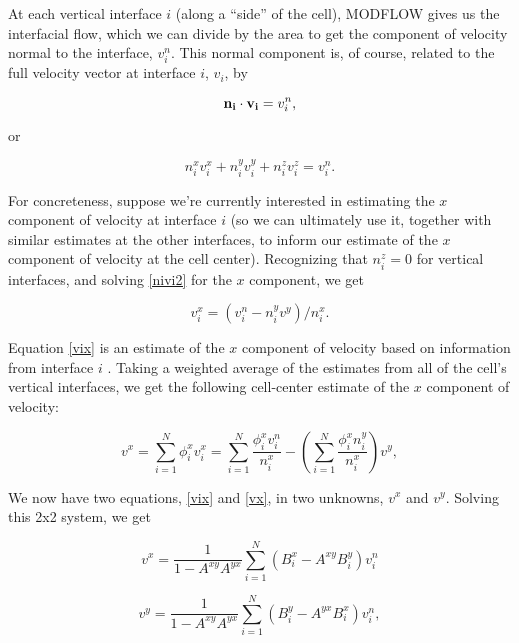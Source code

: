 At each vertical interface $i$ (along a ``side'' of the cell), MODFLOW gives us the interfacial flow, which we can divide by the area to get the component of velocity normal to the interface, $v_i^n$. This normal component is, of course, related to the full velocity vector at interface $i$, $v_i$, by

\begin{equation}
\label{nivi}
\mathbf{n_i} \cdot \mathbf{v_i} = v_i^n,
\end{equation}

\noindent or

\begin{equation}
\label{nivi2}
n_i^x v_i^x + n_i^y v_i^y + n_i^z v_i^z = v_i^n.
\end{equation}

For concreteness, suppose we're currently interested in estimating the $x$ component of velocity at interface $i$ (so we can ultimately use it, together with similar estimates at the other interfaces, to inform our estimate of the $x$ component of velocity at the cell center).  Recognizing that $n_i^z = 0$  for vertical interfaces, and solving \ref{nivi2} for the $x$ component, we get

\begin{equation}
\label{vix}
v_i^x = \left ( v_i^n - n_i^y v^y \right ) / n_i^x.
\end{equation}

Equation \ref{vix} is an estimate of the $x$ component of velocity based on information from interface $i$ . Taking a weighted average of the estimates from all of the cell's vertical interfaces, we get the following cell-center estimate of the $x$ component of velocity:

\begin{equation}
\label{vx}
v^x = \sum_{i=1}^N \phi_i^x v_i^x = \sum_{i=1}^N \frac{\phi_i^x v_i^n}{n_i^x} - \left( \sum_{i=1}^N \frac{\phi_i^x n_i^y}{n_i^x}  \right ) v^y,
\end{equation}

We now have two equations, \ref{vix} and \ref{vx}, in two unknowns, $v^x$ and $v^y$. Solving this 2x2 system, we get

\begin{equation}
\label{vxAB}
v^x = \frac{1}{1 - A^{xy} A^{yx}} \sum_{i=1}^N  \left( B_i^x - A^{xy} B_i^y \right ) v_i^n
\end{equation}

\begin{equation}
\label{vxAB}
v^y = \frac{1}{1 - A^{xy} A^{yx}} \sum_{i=1}^N  \left( B_i^y - A^{yx} B_i^x \right ) v_i^n,
\end{equation}

